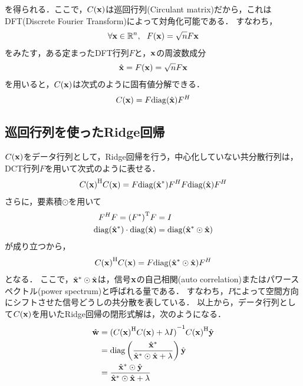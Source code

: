 \documentclass[11pt,a4j]{jarticle}
\begin{document}
      を得られる．ここで，$C({\bf x})$は巡回行列(Circulant matrix)だから，これはDFT(Discrete Fourier Transform)によって対角化可能である．
      すなわち，
      \begin{align}
        \forall {\bf x} \in \mathbb{R}^{n}, ~~ F({\bf x}) = \sqrt{n} F{\bf x}
      \end{align}
      をみたす，ある定まったDFT行列$F$と，$\bf x$の周波数成分
      \begin{align}
        \hat{\bf x} = F({\bf x}) = \sqrt{n} F{\bf x}
      \end{align}
      を用いると，$C({\bf x})$は次式のように固有値分解できる．
      \begin{align}
        C({\bf x}) = F {\rm diag} (\hat{\bf x}) {F}^{H}
      \end{align}

    \subsection{巡回行列を使ったRidge回帰}
      $C({\bf x})$をデータ行列として，Ridge回帰を行う，中心化していない共分散行列は，DCT行列$F$を用いて次式のように表せる．
      \begin{align}
        {C({\bf x})}^{\mathrm{H}}C({\bf x}) = F {\rm diag} (\hat{{\bf x}}^{*}) {F}^{H} F {\rm diag} (\hat{\bf x}) {F}^{H}
      \end{align}
      さらに，要素積$\odot$を用いて
      \begin{align}
        F^{H}F = {( F^{*} )}^{\mathrm{T}} F &= I \\
        {\rm diag} (\hat{{\bf x}}^{*})\cdot {\rm diag} (\hat{\bf x}) &= {\rm diag} ( \hat{{\bf x}}^{*} \odot \hat{\bf x} )
      \end{align}
      が成り立つから，
      \begin{align}
        {C({\bf x})}^{\mathrm{H}}C({\bf x}) = F {\rm diag} ( \hat{{\bf x}}^{*} \odot \hat{\bf x} ) {F}^{H}
      \end{align}
      となる．
      ここで，$\hat{{\bf x}}^{*} \odot \hat{\bf x}$は，信号$\bf x$の自己相関(auto correlation)またはパワースペクトル(power spectrum)と呼ばれる量である．
      すなわち，$P$によって空間方向にシフトさせた信号どうしの共分散を表している．
      以上から，データ行列として$C({\bf x})$を用いたRidge回帰の閉形式解は，次のようになる．
      \begin{align}
        \hat{\bf w} &= { ({C({\bf x})}^{\mathrm{H}} C({\bf x}) + \lambda I) }^{-1} {C({\bf x})}^{\mathrm{H}} \hat{\bf y} \\
                &= {\rm diag} \left( \frac{{\hat{\bf x}}^{*}}{\hat{{\bf x}}^{*} \odot \hat{\bf x} + \lambda} \right) \hat{\bf y} \\
                &= \frac{{\hat{\bf x}}^{*} \odot \hat{\bf y}}{\hat{{\bf x}}^{*} \odot \hat{\bf x} + \lambda} 
      \end{align}
\end{document}

